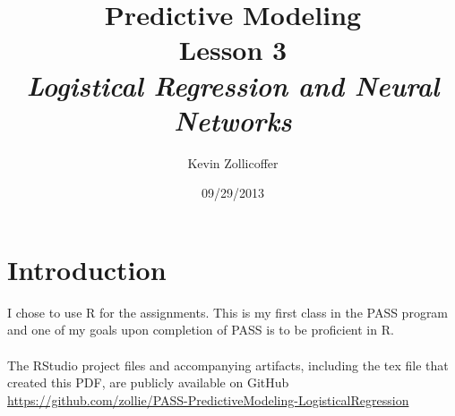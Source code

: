 \documentclass{article}
\author{Kevin Zollicoffer}
\title{Predictive Modeling\\Lesson 3\\\emph{Logistical Regression and Neural Networks}}
\date{09/29/2013}
\begin{document}
\maketitle


\section*{Introduction}
I chose to use R for the assignments. This is my first class in the PASS program and one of my goals upon completion of PASS is to be proficient in R. 
\\
\\
\noindent
The RStudio project files and accompanying artifacts, including the tex file that created this PDF, are publicly available on GitHub
\\
\url{https://github.com/zollie/PASS-PredictiveModeling-LogisticalRegression}
\end{document}
